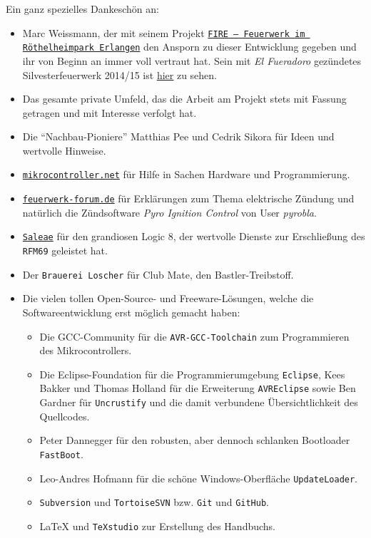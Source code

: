 \documentclass[pdftex, parskip, numbers=noenddot, toc=listof]{scrbook}
\newcommand{\pic}{\emph{Pyro Ignition Control}}
\newcommand{\anlage}{\emph{El Fueradoro}}
\begin{document}
	Ein ganz spezielles Dankeschön an:
	\begin{itemize}
		\item Marc Weissmann, der mit seinem Projekt \href{http://www.facebook.com/FIREErlangen}{\texttt{FIRE -- Feuerwerk im Röthelheimpark Erlangen}} den Ansporn zu dieser Entwicklung gegeben und ihr von Beginn an immer voll vertraut hat. Sein mit {\anlage} gezündetes Silvesterfeuerwerk 2014/15 ist \underline{\href{https://vimeo.com/116115628}{hier}} zu sehen.
		\item Das gesamte private Umfeld, das die Arbeit am Projekt stets mit Fassung getragen und mit Interesse verfolgt hat.
		\item Die \enquote{Nachbau-Pioniere} Matthias Pee und Cedrik Sikora für Ideen und wertvolle Hinweise.
		\item \href{http://www.mikrocontroller.net}{\texttt{mikrocontroller.net}} für Hilfe in Sachen Hardware und Programmierung.
		\item \href{http://www.feuerwerk-forum.de}{\texttt{feuerwerk-forum.de}} für Erklärungen zum Thema elektrische Zündung und natürlich die Zündsoftware {\pic} von User \emph{pyrobla}.
		\item \href{http://www.saleae.com}{\texttt{Saleae}} für den grandiosen Logic 8, der wertvolle Dienste zur Erschließung des \texttt{RFM69} geleistet hat.
		\item Der \texttt{Brauerei Loscher} für Club Mate, den Bastler-Treibstoff.
		\item Die vielen tollen Open-Source- und Freeware-Lösungen, welche die Softwareentwicklung erst möglich gemacht haben:
		      \begin{itemize}
		      	\item Die GCC-Community für die \texttt{AVR-GCC-Toolchain} zum Programmieren des Mikrocontrollers.
		      	\item Die Eclipse-Foundation für die Programmierumgebung \texttt{Eclipse}, Kees Bakker und Thomas Holland für die Erweiterung \texttt{AVREclipse} sowie Ben Gardner für \texttt{Uncrustify} und die damit verbundene Übersichtlichkeit des Quellcodes.
		      	\item Peter Dannegger für den robusten, aber dennoch schlanken Bootloader \texttt{FastBoot}.
		      	\item Leo-Andres Hofmann für die schöne Windows-Oberfläche \texttt{UpdateLoader}.
		      	\item \texttt{Subversion} und \texttt{TortoiseSVN} bzw. \texttt{Git} und \texttt{GitHub}.
		      	\item {\LaTeX} und \texttt{TeXstudio} zur Erstellung des Handbuchs.
		      \end{itemize}
	\end{itemize}
\end{document}
